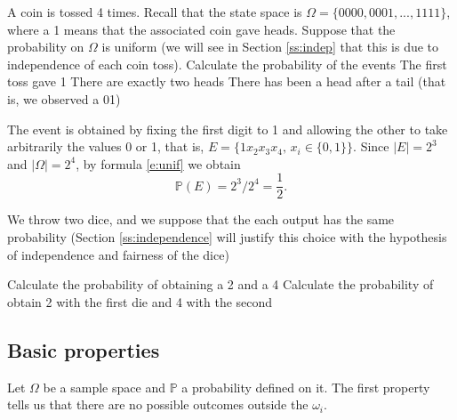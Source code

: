 \begin{ExerciseList}
	\Exercise A coin is tossed 4 times. Recall that the state space is $\Omega=\{0000,0001,...,1111\}$, where a 1 means that the associated coin gave heads. Suppose that the probability on $\Omega$ is uniform (we will see in Section \ref{ss:indep} that this is due to independence of each coin toss). Calculate the probability of the events 
    \Question The first toss gave 1 
    \Question There are exactly two heads 
    \Question There has been a head after a tail (that is, we observed a 01)

    \Question The event is obtained by  fixing the first digit to 1 and allowing the other to take arbitrarily the values 0 or 1, that is, $E = \{ 1x_2x_3x_4,\, x_i \in \{0,1\} \}$. Since $|E| = 2^3$ and $|\Omega| = 2^4$, by formula \eqref{e:unif} we obtain 
    $$\mathbb {P}(E) = 2^3/2^4 = \frac{1}{2}.$$

    
	\Exercise We throw two dice, and we suppose that the each output has the same probability (Section \ref{ss:independence} will justify this choice with the hypothesis of independence and fairness of the dice)
   
    \Question Calculate the probability of obtaining a 2 and a 4
    \Question Calculate the probability of obtain 2 with the first die and 4 with the second 

\end{ExerciseList}


\subsection{Basic properties}

	Let $\Omega$ be a sample space and $\mathbb{P}$ a probability defined on it. The first property tells us that there are no possible outcomes outside the $\omega_i$.   
	\begin{proposition}
\label{p1}
\end{proposition}

